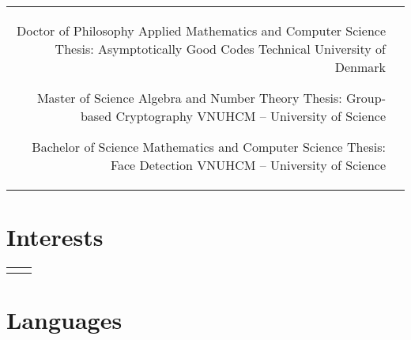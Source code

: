 \documentclass[11pt]{article} %
\begin{document}
\begin{paracol}{2}
\begin{supertabular}{rl}
	
	{Doctor of Philosophy} %
	{Applied Mathematics and Computer Science} %
    {Thesis: Asymptotically Good Codes} %
	{Technical University of Denmark} %
	
	
	{Master of Science} %
	{Algebra and Number Theory} %
    {Thesis: Group-based Cryptography} %
	{VNUHCM -- University of Science} %
	
	
	{Bachelor of Science} %
	{Mathematics and Computer Science} %
    {Thesis: Face Detection} %
	{VNUHCM -- University of Science} %
	

\end{supertabular}


\section{Interests}

\begin{supertabular}{rl} %
	

\end{supertabular}    


\medskip %


\section{Languages}


\end{paracol}
\end{document}
